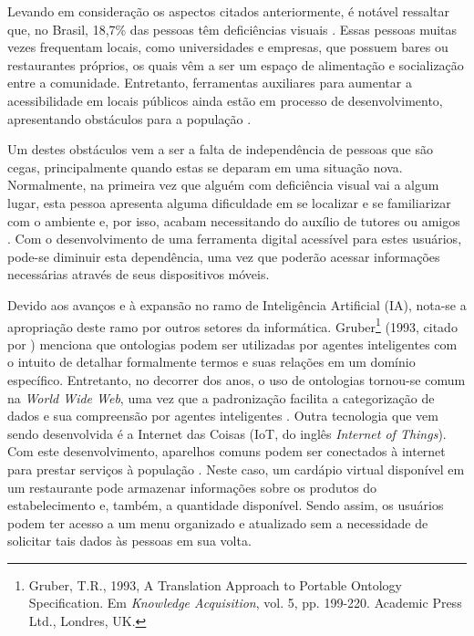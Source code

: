 Levando em consideração os aspectos citados anteriormente, é notável ressaltar que, no Brasil, 18,7\% das pessoas têm deficiências visuais \cite{IBGE2011}. Essas pessoas muitas vezes frequentam locais, como universidades e empresas, que possuem bares ou restaurantes próprios, os quais vêm a ser um espaço de alimentação e socialização entre a comunidade. Entretanto, ferramentas auxiliares para aumentar a acessibilidade em locais públicos ainda estão em processo de desenvolvimento, apresentando obstáculos para a população \cite{PATEL2012}.

Um destes obstáculos vem a ser a falta de independência de pessoas que são cegas, principalmente quando estas se deparam em uma situação nova. Normalmente, na primeira vez que alguém com deficiência visual vai a algum lugar, esta pessoa apresenta alguma dificuldade em se localizar e se familiarizar com o ambiente e, por isso, acabam necessitando do auxílio de tutores ou amigos \cite{DATRI2007}. Com o desenvolvimento de uma ferramenta digital acessível para estes usuários, pode-se diminuir esta dependência, uma vez que poderão acessar informações necessárias através de seus dispositivos móveis.

Devido aos avanços e à expansão no ramo de Inteligência Artificial (IA), nota-se a apropriação deste ramo por outros setores da informática. Gruber\footnote{Gruber, T.R., 1993,  A Translation Approach to Portable Ontology Specification. Em \emph{Knowledge Acquisition}, vol. 5, pp. 199-220. Academic Press Ltd., Londres, UK.} (1993, citado por \cite{NOY2001}) menciona que ontologias podem ser utilizadas por agentes inteligentes com o intuito de detalhar formalmente termos e suas relações em um domínio específico. Entretanto, no decorrer dos anos, o uso de ontologias tornou-se comum na \textit{World Wide Web}, uma vez que a padronização facilita a categorização de dados e sua compreensão por agentes inteligentes \cite{NOY2001}. Outra tecnologia que vem sendo desenvolvida é a Internet das Coisas (IoT, do inglês \emph{Internet of Things}). Com este desenvolvimento, aparelhos comuns podem ser conectados à internet para prestar serviços à população \cite{FRIESS2013}. Neste caso, um cardápio virtual disponível em um restaurante pode armazenar informações sobre os produtos do estabelecimento e, também, a quantidade disponível. Sendo assim, os usuários podem ter acesso a um menu organizado e atualizado sem a necessidade de solicitar tais dados às pessoas em sua volta.


